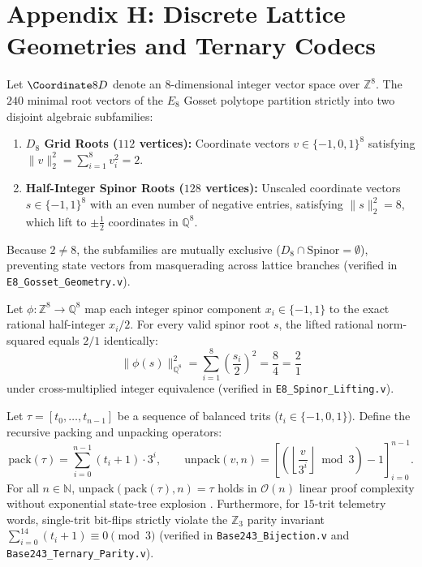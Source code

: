 \section*{Appendix H: Discrete Lattice Geometries and Ternary Codecs}
\label{app:lattices}

\begin{definition}
Let $\Coordinate8D$ denote an $8$-dimensional integer vector space over $\mathbb{Z}^8$. The $240$ minimal root vectors of the $E_8$ Gosset polytope partition strictly into two disjoint algebraic subfamilies:
\begin{enumerate}
  \item \textbf{$D_8$ Grid Roots ($112$ vertices):} Coordinate vectors $v \in \{-1, 0, 1\}^8$ satisfying $\|v\|_2^2 = \sum_{i=1}^8 v_i^2 = 2$.
  \item \textbf{Half-Integer Spinor Roots ($128$ vertices):} Unscaled coordinate vectors $s \in \{-1, 1\}^8$ with an even number of negative entries, satisfying $\|s\|_2^2 = 8$, which lift to $\pm \frac{1}{2}$ coordinates in $\mathbb{Q}^8$.
\end{enumerate}
Because $2 \neq 8$, the subfamilies are mutually exclusive ($D_8 \cap \mathrm{Spinor} = \emptyset$), preventing state vectors from masquerading across lattice branches (verified in \texttt{E8\_Gosset\_Geometry.v}).
\end{definition}

\begin{lemma}
Let $\phi : \mathbb{Z}^8 \to \mathbb{Q}^8$ map each integer spinor component $x_i \in \{-1, 1\}$ to the exact rational half-integer $x_i / 2$. For every valid spinor root $s$, the lifted rational norm-squared equals $2/1$ identically:
\begin{equation}
  \|\phi(s)\|_{\mathbb{Q}^8}^2 = \sum_{i=1}^8 \left(\frac{s_i}{2}\right)^2 = \frac{8}{4} = \frac{2}{1}
\end{equation}
under cross-multiplied integer equivalence (verified in \texttt{E8\_Spinor\_Lifting.v}).
\end{lemma}

\begin{theorem}
Let $\tau = [t_0, \dots, t_{n-1}]$ be a sequence of balanced trits ($t_i \in \{-1, 0, 1\}$). Define the recursive packing and unpacking operators:
\begin{equation}
  \mathrm{pack}(\tau) = \sum_{i=0}^{n-1} (t_i + 1) \cdot 3^i, \qquad \mathrm{unpack}(v, n) = \left[ \left(\left\lfloor \frac{v}{3^i} \right\rfloor \bmod 3\right) - 1 \right]_{i=0}^{n-1}.
\end{equation}
For all $n \in \mathbb{N}$, $\mathrm{unpack}(\mathrm{pack}(\tau), n) = \tau$ holds in $\mathcal{O}(n)$ linear proof complexity without exponential state-tree explosion \cite{barrett2024smt}. Furthermore, for $15$-trit telemetry words, single-trit bit-flips strictly violate the $\mathbb{Z}_3$ parity invariant $\sum_{i=0}^{14} (t_i + 1) \equiv 0 \pmod 3$ (verified in \texttt{Base243\_Bijection.v} and \texttt{Base243\_Ternary\_Parity.v}).
\end{theorem}
